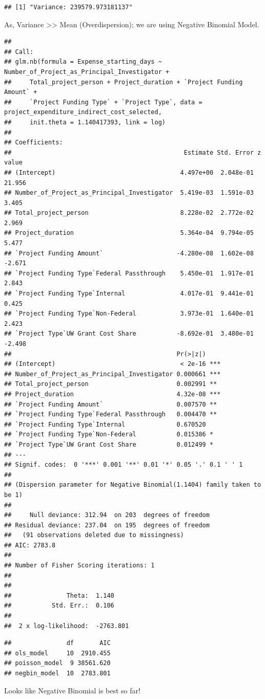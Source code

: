 \documentclass[
]{article}
\begin{document}
\begin{verbatim}
## [1] "Variance: 239579.973181137"
\end{verbatim}

As, Variance \textgreater\textgreater{} Mean (Overdispersion); we are
using Negative Binomial Model.

\begin{verbatim}
## 
## Call:
## glm.nb(formula = Expense_starting_days ~ Number_of_Project_as_Principal_Investigator + 
##     Total_project_person + Project_duration + `Project Funding Amount` + 
##     `Project Funding Type` + `Project Type`, data = project_expenditure_indirect_cost_selected, 
##     init.theta = 1.140417393, link = log)
## 
## Coefficients:
##                                               Estimate Std. Error z value
## (Intercept)                                  4.497e+00  2.048e-01  21.956
## Number_of_Project_as_Principal_Investigator  5.419e-03  1.591e-03   3.405
## Total_project_person                         8.228e-02  2.772e-02   2.969
## Project_duration                             5.364e-04  9.794e-05   5.477
## `Project Funding Amount`                    -4.280e-08  1.602e-08  -2.671
## `Project Funding Type`Federal Passthrough    5.450e-01  1.917e-01   2.843
## `Project Funding Type`Internal               4.017e-01  9.441e-01   0.425
## `Project Funding Type`Non-Federal            3.973e-01  1.640e-01   2.423
## `Project Type`UW Grant Cost Share           -8.692e-01  3.480e-01  -2.498
##                                             Pr(>|z|)    
## (Intercept)                                  < 2e-16 ***
## Number_of_Project_as_Principal_Investigator 0.000661 ***
## Total_project_person                        0.002991 ** 
## Project_duration                            4.32e-08 ***
## `Project Funding Amount`                    0.007570 ** 
## `Project Funding Type`Federal Passthrough   0.004470 ** 
## `Project Funding Type`Internal              0.670520    
## `Project Funding Type`Non-Federal           0.015386 *  
## `Project Type`UW Grant Cost Share           0.012499 *  
## ---
## Signif. codes:  0 '***' 0.001 '**' 0.01 '*' 0.05 '.' 0.1 ' ' 1
## 
## (Dispersion parameter for Negative Binomial(1.1404) family taken to be 1)
## 
##     Null deviance: 312.94  on 203  degrees of freedom
## Residual deviance: 237.04  on 195  degrees of freedom
##   (91 observations deleted due to missingness)
## AIC: 2783.8
## 
## Number of Fisher Scoring iterations: 1
## 
## 
##               Theta:  1.140 
##           Std. Err.:  0.106 
## 
##  2 x log-likelihood:  -2763.801
\end{verbatim}

\begin{verbatim}
##               df       AIC
## ols_model     10  2910.455
## poisson_model  9 38561.620
## negbin_model  10  2783.801
\end{verbatim}

Looks like Negative Binomial is best so far!
\end{document}
